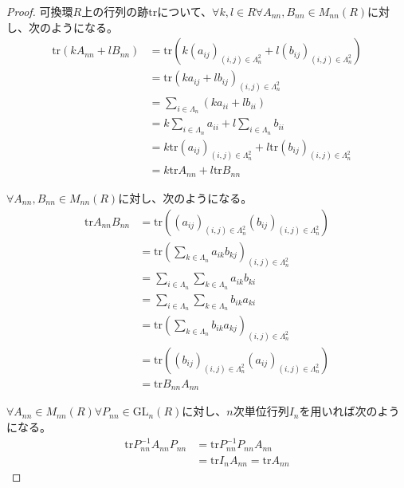 \documentclass[dvipdfmx]{jsarticle}
\begin{document}
\begin{proof}
可換環$R$上の行列の跡$\mathrm{tr} $について、$\forall k,l \in R\forall A_{nn},B_{nn} \in M_{nn}(R)$に対し、次のようになる。
\begin{align*}
{\mathrm{tr} }\left( kA_{nn} + lB_{nn} \right) &= {\mathrm{tr} }\left( k\left( a_{ij} \right)_{(i,j) \in \varLambda_{n}^{2}} + l\left( b_{ij} \right)_{(i,j) \in \varLambda_{n}^{2}} \right)\\
&= {\mathrm{tr} }\left( ka_{ij} + lb_{ij} \right)_{(i,j) \in \varLambda_{n}^{2}}\\
&= \sum_{i \in \varLambda_{n}} \left( ka_{ii} + lb_{ii} \right)\\
&= k\sum_{i \in \varLambda_{n}} a_{ii} + l\sum_{i \in \varLambda_{n}} b_{ii}\\
&= k{\mathrm{tr} }\left( a_{ij} \right)_{(i,j) \in \varLambda_{n}^{2}} + l{\mathrm{tr} }\left( b_{ij} \right)_{(i,j) \in \varLambda_{n}^{2}}\\
&= k{\mathrm{tr} }A_{nn} + l{\mathrm{tr} }B_{nn}
\end{align*}\par
$\forall A_{nn},B_{nn}\in M_{nn}(R)$に対し、次のようになる。
\begin{align*}
{\mathrm{tr} }{A_{nn}B_{nn}} &= {\mathrm{tr} }\left( \left( a_{ij} \right)_{(i,j) \in \varLambda_{n}^{2}}\left( b_{ij} \right)_{(i,j) \in \varLambda_{n}^{2}} \right)\\
&= {\mathrm{tr} }\left( \sum_{k \in \varLambda_{n}} {a_{ik}b_{kj}} \right)_{(i,j) \in \varLambda_{n}^{2}}\\
&= \sum_{i \in \varLambda_{n}} {\sum_{k \in \varLambda_{n}} {a_{ik}b_{ki}}}\\
&= \sum_{i \in \varLambda_{n}} {\sum_{k \in \varLambda_{n}} {b_{ik}a_{ki}}}\\
&= {\mathrm{tr} }\left( \sum_{k \in \varLambda_{n}} {b_{ik}a_{kj}} \right)_{(i,j) \in \varLambda_{n}^{2}}\\
&= {\mathrm{tr} }\left( \left( b_{ij} \right)_{(i,j) \in \varLambda_{n}^{2}}\left( a_{ij} \right)_{(i,j) \in \varLambda_{n}^{2}} \right)\\
&= {\mathrm{tr} }{B_{nn}A_{nn}}
\end{align*}\par
$\forall A_{nn} \in M_{nn}(R)\forall P_{nn} \in {\mathrm{GL}}_{n}(R)$に対し、$n$次単位行列$I_{n}$を用いれば次のようになる。
\begin{align*}
{\mathrm{tr} }{P_{nn}^{- 1}A_{nn}P_{nn}} &= {\mathrm{tr} }{P_{nn}^{- 1}P_{nn}A_{nn}}\\
&= {\mathrm{tr} }{I_{n}A_{nn}} = {\mathrm{tr} }A_{nn}
\end{align*}
\end{proof}
\end{document}
